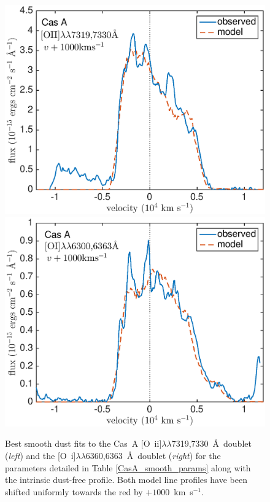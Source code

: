 \begin{figure}
\centering
\includegraphics[scale=0.41,clip=true, trim=15 0 40 20]{chapters/chapter6/figs/CasA/CasA_shifted1000_OII}
\includegraphics[scale=0.41,clip=true, trim=15 0 40 20]{chapters/chapter6/figs/CasA/CasA_OI_shifted1000}
\caption{Best smooth dust fits to the Cas~A [O~{\sc ii}]$\lambda\lambda$7319,7330~\AA\  doublet ({\em left}) and the [O~{\sc i}]$\lambda\lambda$6360,6363~\AA\  doublet ({\em right}) for the parameters detailed in Table \ref{CasA_smooth_params} along with the intrinsic dust-free profile.  Both model line profiles have been shifted uniformly towards the red by $+1000$~km~s$^{-1}$.}
\label{CasA_OI_OII}
\end{figure}

